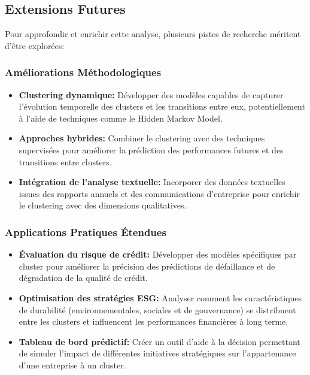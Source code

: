 \documentclass[12pt]{article}
\begin{document}
\subsection{Extensions Futures}
Pour approfondir et enrichir cette analyse, plusieurs pistes de recherche méritent d'être explorées:

\subsubsection{Améliorations Méthodologiques}
\begin{itemize}
    \item \textbf{Clustering dynamique:} Développer des modèles capables de capturer l'évolution temporelle des clusters et les transitions entre eux, potentiellement à l'aide de techniques comme le Hidden Markov Model.
    
    \item \textbf{Approches hybrides:} Combiner le clustering avec des techniques supervisées pour améliorer la prédiction des performances futures et des transitions entre clusters.
    
    \item \textbf{Intégration de l'analyse textuelle:} Incorporer des données textuelles issues des rapports annuels et des communications d'entreprise pour enrichir le clustering avec des dimensions qualitatives.
\end{itemize}

\subsubsection{Applications Pratiques Étendues}
\begin{itemize}
    \item \textbf{Évaluation du risque de crédit:} Développer des modèles spécifiques par cluster pour améliorer la précision des prédictions de défaillance et de dégradation de la qualité de crédit.
    
    \item \textbf{Optimisation des stratégies ESG:} Analyser comment les caractéristiques de durabilité (environnementales, sociales et de gouvernance) se distribuent entre les clusters et influencent les performances financières à long terme.
    
    \item \textbf{Tableau de bord prédictif:} Créer un outil d'aide à la décision permettant de simuler l'impact de différentes initiatives stratégiques sur l'appartenance d'une entreprise à un cluster.
\end{itemize}
\end{document}

